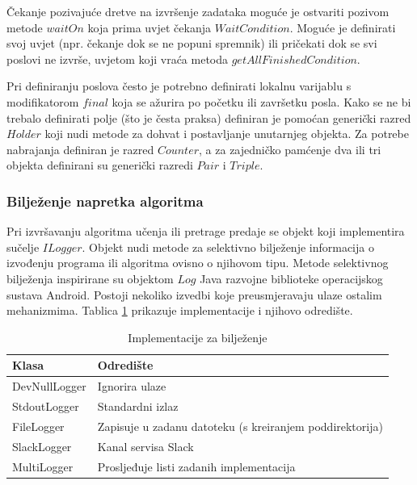 \documentclass[times, utf8, numeric, diplomski]{fer}
\begin{document}
Čekanje pozivajuće dretve na izvršenje zadataka moguće je ostvariti pozivom metode $waitOn$ koja prima uvjet čekanja $WaitCondition$. Moguće je definirati svoj uvjet (npr. čekanje dok se ne popuni spremnik) ili pričekati dok se svi poslovi ne izvrše, uvjetom koji vraća metoda $getAllFinishedCondition$.

Pri definiranju poslova često je potrebno definirati lokalnu varijablu s modifikatorom $final$ koja se ažurira po početku ili završetku posla. Kako se ne bi trebalo definirati polje (što je česta praksa) definiran je pomoćan generički razred $Holder$ koji nudi metode za dohvat i postavljanje unutarnjeg objekta. Za potrebe nabrajanja definiran je razred $Counter$, a za zajedničko pamćenje dva ili tri objekta definirani su generički razredi $Pair$ i $Triple$.

\subsubsection{Bilježenje napretka algoritma}

%

Pri izvršavanju algoritma učenja ili pretrage predaje se objekt koji implementira sučelje $ILogger$. Objekt nudi metode za selektivno bilježenje informacija o izvođenju programa ili algoritma ovisno o njihovom tipu. Metode selektivnog bilježenja inspirirane su objektom $Log$ Java razvojne biblioteke operacijskog sustava Android. Postoji nekoliko izvedbi koje preusmjeravaju ulaze ostalim mehanizmima. Tablica \ref{tab:loggers} prikazuje implementacije i njihovo odredište.

\begin{table}[h]
\begin{tabular}{ll}
Klasa & Odredište \\
\hline
DevNullLogger & Ignorira ulaze \\
StdoutLogger & Standardni izlaz \\
FileLogger & Zapisuje u zadanu datoteku (s kreiranjem poddirektorija) \\
SlackLogger & Kanal servisa Slack \\
MultiLogger & Prosljeđuje listi zadanih implementacija
\end{tabular}
\centering
\caption{Implementacije za bilježenje}
\label{tab:loggers}
\end{table}
\end{document}

